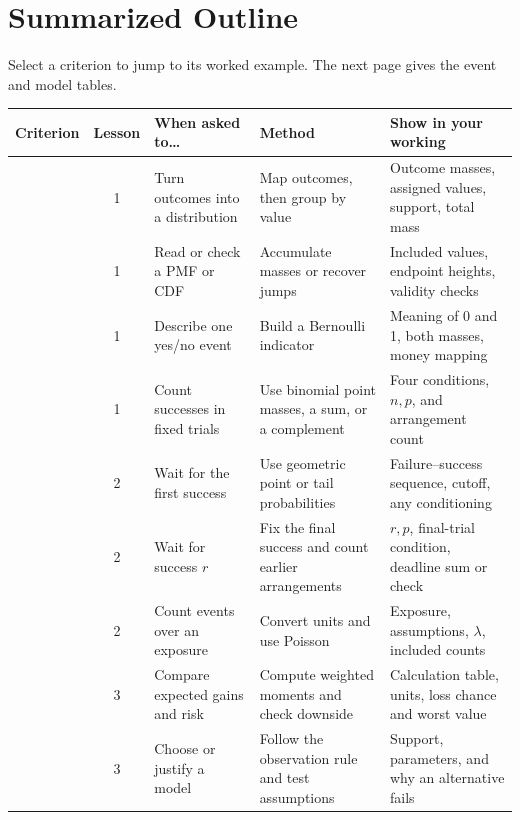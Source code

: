 \par\nobreak
\secInicio

\clearpage
\section{Summarized Outline}\label{sec:map}
Select a criterion to jump to its worked example. The next page gives the event and model tables.

{\small\noindent
\begin{tabularx}{\linewidth}{@{}l c L L L@{}}
\toprule
\textbf{Criterion} & \textbf{Lesson} & \textbf{When asked to\ldots} & \textbf{Method} & \textbf{Show in your working}\\
\midrule
{} & 1 & Turn outcomes into a distribution & Map outcomes, then group by value & Outcome masses, assigned values, support, total mass\\
 & 1 & Read or check a PMF or CDF & Accumulate masses or recover jumps & Included values, endpoint heights, validity checks\\
 & 1 & Describe one yes/no event & Build a Bernoulli indicator & Meaning of 0 and 1, both masses, money mapping\\
 & 1 & Count successes in fixed trials & Use binomial point masses, a sum, or a complement & Four conditions, \(n,p\), and arrangement count\\
 & 2 & Wait for the first success & Use geometric point or tail probabilities & Failure--success sequence, cutoff, any conditioning\\
 & 2 & Wait for success \(r\) & Fix the final success and count earlier arrangements & \(r,p\), final-trial condition, deadline sum or check\\
 & 2 & Count events over an exposure & Convert units and use Poisson & Exposure, assumptions, \(\lambda\), included counts\\
 & 3 & Compare expected gains and risk & Compute weighted moments and check downside & Calculation table, units, loss chance and worst value\\
 & 3 & Choose or justify a model & Follow the observation rule and test assumptions & Support, parameters, and why an alternative fails\\
\bottomrule
\end{tabularx}\par
}


